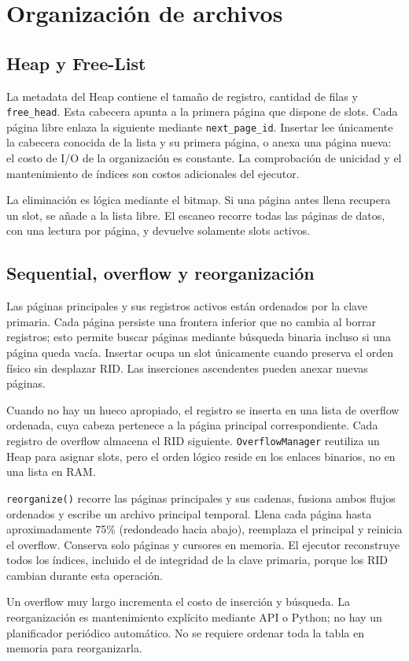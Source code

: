 \section{Organización de archivos}
\subsection{Heap y Free-List}
La metadata del Heap contiene el tamaño de registro, cantidad de filas y \texttt{free\_head}. Esta cabecera apunta a la primera página que dispone de slots. Cada página libre enlaza la siguiente mediante \texttt{next\_page\_id}. Insertar lee únicamente la cabecera conocida de la lista y su primera página, o anexa una página nueva: el costo de I/O de la organización es constante. La comprobación de unicidad y el mantenimiento de índices son costos adicionales del ejecutor.

La eliminación es lógica mediante el bitmap. Si una página antes llena recupera un slot, se añade a la lista libre. El escaneo recorre todas las páginas de datos, con una lectura por página, y devuelve solamente slots activos.

\subsection{Sequential, overflow y reorganización}
Las páginas principales y sus registros activos están ordenados por la clave primaria. Cada página persiste una frontera inferior que no cambia al borrar registros; esto permite buscar páginas mediante búsqueda binaria incluso si una página queda vacía. Insertar ocupa un slot únicamente cuando preserva el orden físico sin desplazar RID. Las inserciones ascendentes pueden anexar nuevas páginas.

Cuando no hay un hueco apropiado, el registro se inserta en una lista de overflow ordenada, cuya cabeza pertenece a la página principal correspondiente. Cada registro de overflow almacena el RID siguiente. \texttt{OverflowManager} reutiliza un Heap para asignar slots, pero el orden lógico reside en los enlaces binarios, no en una lista en RAM.

\texttt{reorganize()} recorre las páginas principales y sus cadenas, fusiona ambos flujos ordenados y escribe un archivo principal temporal. Llena cada página hasta aproximadamente 75\% (redondeado hacia abajo), reemplaza el principal y reinicia el overflow. Conserva solo páginas y cursores en memoria. El ejecutor reconstruye todos los índices, incluido el de integridad de la clave primaria, porque los RID cambian durante esta operación.

Un overflow muy largo incrementa el costo de inserción y búsqueda. La reorganización es mantenimiento explícito mediante API o Python; no hay un planificador periódico automático. No se requiere ordenar toda la tabla en memoria para reorganizarla.
